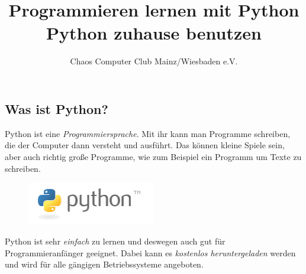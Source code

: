 



	\title{Programmieren lernen mit Python\\Python zuhause benutzen}
	\author{Chaos Computer Club Mainz/Wiesbaden e.V.}
	\maketitle
	
	\subsection*{Was ist Python?}
	Python ist eine \emph{Programmiersprache}. Mit ihr kann man Programme schreiben, die der Computer dann versteht und ausführt. Das können kleine Spiele sein, aber auch richtig große Programme, wie zum Beispiel ein Programm um Texte zu schreiben.
	
	\begin{figure}[htbp]
		\centering
		\includegraphics[width=0.5\textwidth]{img/python-logo.png}
	\end{figure}
	
	Python ist sehr \emph{einfach} zu lernen und deswegen auch gut für Programmieranfänger geeignet. Dabei kann es \emph{kostenlos heruntergeladen} werden und wird für alle gängigen Betriebssysteme angeboten.
	
